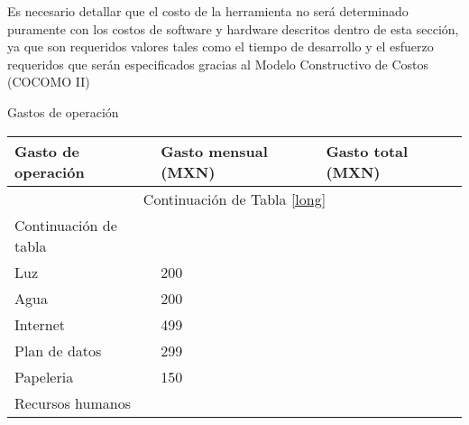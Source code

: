 Es necesario detallar que el costo de la herramienta no será determinado puramente con los costos de software y hardware descritos dentro de esta sección, ya que son requeridos valores tales como el tiempo de desarrollo y el esfuerzo requeridos que serán especificados gracias al Modelo Constructivo de Costos (COCOMO II)

Gastos de operación
\begin{longtable}{ l | l |l }	
	
	\hline
	
	\textbf{Gasto de operación } & \textbf{Gasto mensual (MXN) }  & \textbf{Gasto total (MXN) } \\
	\hline
	\hline
	
	\endfirsthead
	
	\multicolumn{3}{c}{Continuación de Tabla \ref{long}}\\
	\hline
	Continuación de tabla\\
	\hline
	\endhead
	
	\hline
	\endfoot
	
	Luz & 200 &\\
	\hline
	Agua & 200 &\\
	\hline
	Internet & 499 & \\
	\hline
	Plan de datos & 299 &\\
	\hline
	Papeleria & 150 &\\
	\hline
	Recursos humanos &  &\\
	
\end{longtable}


